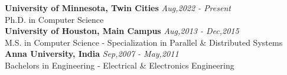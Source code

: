 {\bf University of Minnesota, Twin Cities}   \hfill {\em Aug,2022 - Present} \\
Ph.D. in Computer Science \smallskip \\
{\bf University of Houston, Main Campus}     \hfill {\em Aug,2013 - Dec,2015} \\
M.S. in Computer Science - Specialization in Parallel \& Distributed Systems \smallskip \\
{\bf Anna University, India}                 \hfill {\em Sep,2007 - May,2011} \\
Bachelors in Engineering - Electrical \& Electronics Engineering \smallskip

